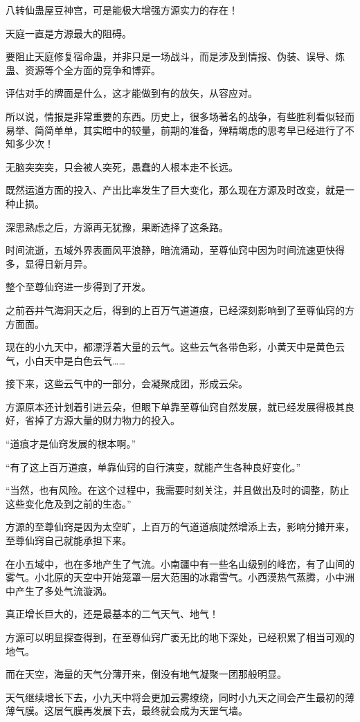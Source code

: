 \begin{this_body}
八转仙蛊屋豆神宫，可是能极大增强方源实力的存在！

天庭一直是方源最大的阻碍。

要阻止天庭修复宿命蛊，并非只是一场战斗，而是涉及到情报、伪装、误导、炼蛊、资源等个全方面的竞争和博弈。

评估对手的牌面是什么，这才能做到有的放矢，从容应对。

所以说，情报是非常重要的东西。历史上，很多场著名的战争，有些胜利看似轻而易举、简简单单，其实暗中的较量，前期的准备，殚精竭虑的思考早已经进行了不知多少次！

无脑突突突，只会被人突死，愚蠢的人根本走不长远。

既然运道方面的投入、产出比率发生了巨大变化，那么现在方源及时改变，就是一种止损。

深思熟虑之后，方源再无犹豫，果断选择了这条路。

时间流逝，五域外界表面风平浪静，暗流涌动，至尊仙窍中因为时间流速更快得多，显得日新月异。

整个至尊仙窍进一步得到了开发。

之前吞并气海洞天之后，得到的上百万气道道痕，已经深刻影响到了至尊仙窍的方方面面。

现在的小九天中，都漂浮着大量的云气。这些云气各带色彩，小黄天中是黄色云气，小白天中是白色云气……

接下来，这些云气中的一部分，会凝聚成团，形成云朵。

方源原本还计划着引进云朵，但眼下单靠至尊仙窍自然发展，就已经发展得极其良好，省掉了方源大量的财力物力的投入。

“道痕才是仙窍发展的根本啊。”

“有了这上百万道痕，单靠仙窍的自行演变，就能产生各种良好变化。”

“当然，也有风险。在这个过程中，我需要时刻关注，并且做出及时的调整，防止这些变化危及到之前的生态。”

方源的至尊仙窍是因为太空旷，上百万的气道道痕陡然增添上去，影响分摊开来，至尊仙窍自己就能承担下来。

在小五域中，也在多地产生了气流。小南疆中有一些名山级别的峰峦，有了山间的雾气。小北原的天空中开始笼罩一层大范围的冰霜雪气。小西漠热气蒸腾，小中洲中产生了多处气流漩涡。

真正增长巨大的，还是最基本的二气天气、地气！

方源可以明显探查得到，在至尊仙窍广袤无比的地下深处，已经积累了相当可观的地气。

而在天空，海量的天气分薄开来，倒没有地气凝聚一团那般明显。

天气继续增长下去，小九天中将会更加云雾缭绕，同时小九天之间会产生最初的薄薄气膜。这层气膜再发展下去，最终就会成为天罡气墙。


\end{this_body}
